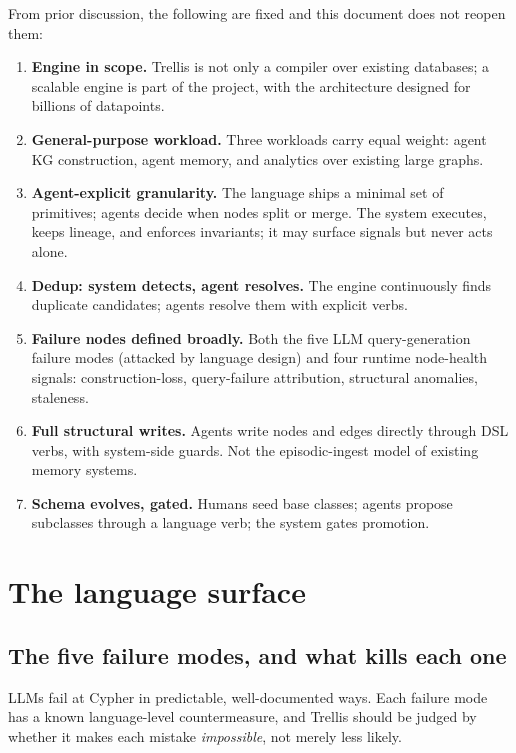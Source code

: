 \documentclass[11pt]{article}
\begin{document}
\begin{settledbox}
From prior discussion, the following are fixed and this document does not reopen them:
\begin{enumerate}[leftmargin=1.4em,itemsep=1pt]
  \item \textbf{Engine in scope.} Trellis is not only a compiler over existing databases; a scalable engine is part of the project, with the architecture designed for billions of datapoints.
  \item \textbf{General-purpose workload.} Three workloads carry equal weight: agent KG construction, agent memory, and analytics over existing large graphs.
  \item \textbf{Agent-explicit granularity.} The language ships a minimal set of primitives; agents decide when nodes split or merge. The system executes, keeps lineage, and enforces invariants; it may surface signals but never acts alone.
  \item \textbf{Dedup: system detects, agent resolves.} The engine continuously finds duplicate candidates; agents resolve them with explicit verbs.
  \item \textbf{Failure nodes defined broadly.} Both the five LLM query-generation failure modes (attacked by language design) and four runtime node-health signals: construction-loss, query-failure attribution, structural anomalies, staleness.
  \item \textbf{Full structural writes.} Agents write nodes and edges directly through DSL verbs, with system-side guards. Not the episodic-ingest model of existing memory systems.
  \item \textbf{Schema evolves, gated.} Humans seed base classes; agents propose subclasses through a language verb; the system gates promotion.
\end{enumerate}
\end{settledbox}

\section{The language surface}

\subsection{The five failure modes, and what kills each one}

LLMs fail at Cypher in predictable, well-documented ways. Each failure mode has a known language-level countermeasure, and Trellis should be judged by whether it makes each mistake \emph{impossible}, not merely less likely.
\end{document}
